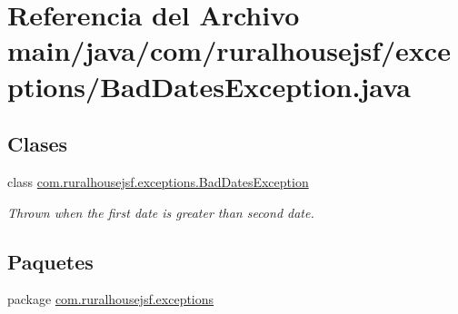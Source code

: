 \hypertarget{a00062}{}\section{Referencia del Archivo main/java/com/ruralhousejsf/exceptions/\+Bad\+Dates\+Exception.java}
\label{a00062}
\subsection*{Clases}
\begin{DoxyCompactItemize}
\item 
class \mbox{\hyperlink{a00208}{com.\+ruralhousejsf.\+exceptions.\+Bad\+Dates\+Exception}}
\begin{DoxyCompactList}\small\item\em Thrown when the first date is greater than second date. \end{DoxyCompactList}\end{DoxyCompactItemize}
\subsection*{Paquetes}
\begin{DoxyCompactItemize}
\item 
package \mbox{\hyperlink{a00118}{com.\+ruralhousejsf.\+exceptions}}
\end{DoxyCompactItemize}
